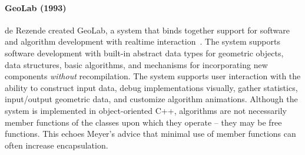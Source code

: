 % 

\paragraph{GeoLab (1993)}

de Rezende created GeoLab, a system that binds together support for software and
algorithm development with realtime interaction~\cite{de1993geolab,
de1993animation}. The system supports software development with built-in
abstract data types for geometric objects, data structures, basic algorithms,
and mechanisms for incorporating new components \emph{without} recompilation.
The system supports user interaction with the ability to construct input data,
debug implementations visually, gather statistics, input/output geometric data,
and customize algorithm animations. Although the system is implemented in
object-oriented C++, algorithms are not necessarily member functions of the
classes upon which they operate -- they may be free functions. This echoes
Meyer's advice that minimal use of member functions can often increase
encapsulation.

